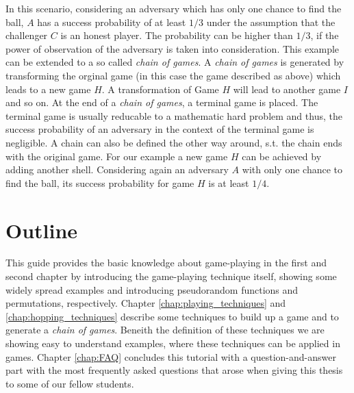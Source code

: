 In this scenario, considering an adversary which has only one chance to find the ball, $A$ has a success probability of at least $1/3$ under the assumption
that the challenger $C$ is an honest player. The probability can be higher than $1/3$, if the power of observation of the adversary is taken into consideration.
This example can be extended to a so called \textit{chain of games}. A \textit{chain of games} is generated by transforming the orginal game (in this case the
game described as above) which leads to a new game $H$. A transformation of Game $H$ will lead to another game $I$ and so on. At the end of a \textit{chain of games},
a terminal game is placed. The terminal game is usually reducable to a mathematic hard problem and thus, the success probability of an adversary in the context
of the terminal game is negligible. A chain can also be defined the other way around, s.t. the chain ends with the original game.
For our example a new game $H$ can be achieved by adding another shell. Considering again an adversary $A$ with only one chance to find the ball,
its success probability for game $H$ is at least $1/4$.

\section*{Outline}
This guide provides the basic knowledge about game-playing in the first and second chapter by introducing the game-playing technique itself, showing some
widely spread examples and introducing pseudorandom functions and permutations, respectively.
Chapter \ref{chap:playing_techniques} and \ref{chap:hopping_techniques} describe some techniques to build up a game and to generate a \textit{chain of games}.
Beneith the definition of these techniques we are showing easy to understand examples, where these techniques can be applied in games.
Chapter \ref{chap:FAQ} concludes this tutorial with a question-and-answer part with the most frequently asked questions that arose when
giving this thesis to some of our fellow students.


